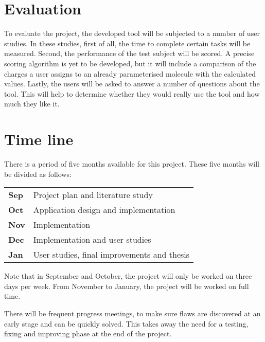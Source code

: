 \section{Evaluation}

To evaluate the project, the developed tool will be subjected to a number of user studies. In these studies, first of all, the time to complete certain tasks will be measured. Second, the performance of the test subject will be scored. A precise scoring algorithm is yet to be developed, but it will include a comparison of the charges a user assigns to an already parameterised molecule with the calculated values. Lastly, the users will be asked to answer a number of questions about the tool. This will help to determine whether they would really use the tool and how much they like it.


\section{Time line}

There is a period of five months available for this project. These five months will be divided as follows:

\begin{tabular}{l|l}
\textbf{Sep} & Project plan and literature study\\
\textbf{Oct} & Application design and implementation\\
\textbf{Nov} & Implementation\\
\textbf{Dec} & Implementation and user studies\\
\textbf{Jan} & User studies, final improvements and thesis
\end{tabular}

\noindent
Note that in September and October, the project will only be worked on three days per week. From November to January, the project will be worked on full time.

There will be frequent progress meetings, to make sure flaws are discovered at an early stage and can be quickly solved. This takes away the need for a testing, fixing and improving phase at the end of the project.
